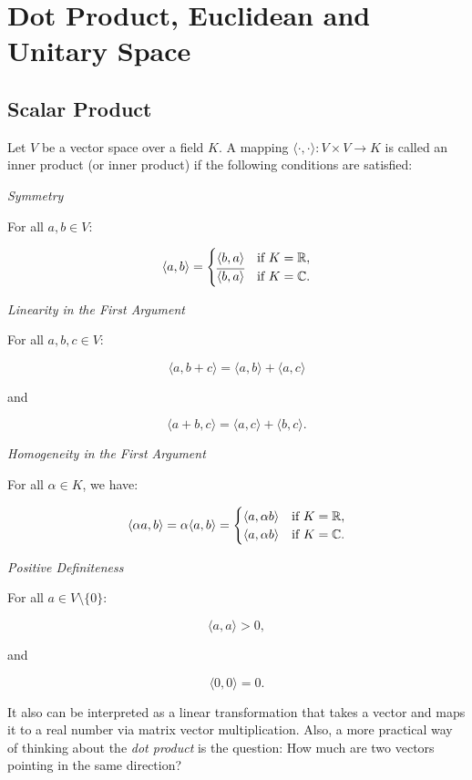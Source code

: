 \newpage
\section{Dot Product, Euclidean and Unitary Space}

\subsection{Scalar Product}

Let \(V\) be a vector space over a field \(K\). A mapping \(\langle \cdot, \cdot \rangle : V \times V 
\to K\) is called an inner product (or inner product) if the following conditions are satisfied:
\vspace{\baselineskip}

\emph{Symmetry}

For all \(a, b \in V\):

\[
    \langle a, b \rangle = 
    \begin{cases}
    \langle b, a \rangle & \text{if } K = \mathbb{R}, \\
    \overline{\langle b, a \rangle} & \text{if } K = \mathbb{C}.
    \end{cases}
\]

\emph{Linearity in the First Argument}

For all \(a, b, c \in V\):

\[
    \langle a, b + c \rangle = \langle a, b \rangle + \langle a, c \rangle
\]

and

\[
    \langle a + b, c \rangle = \langle a, c \rangle + \langle b, c \rangle.
\]

\emph{Homogeneity in the First Argument}

For all \(\alpha \in K\), we have:

\[
    \langle \alpha a, b \rangle = \alpha \langle a, b \rangle = 
    \begin{cases}
    \langle a, \alpha b \rangle & \text{if } K = \mathbb{R}, \\
    \langle a, \alpha b \rangle & \text{if } K = \mathbb{C}.
    \end{cases}
\]

\emph{Positive Definiteness}

For all \(a \in V \setminus \{0\}\):

\[
    \langle a, a \rangle > 0,
\]

and

\[
    \langle 0, 0 \rangle = 0.
\]

It also can be interpreted as a linear transformation that takes a vector and maps it to a real number
 via matrix vector multiplication. Also, a more practical way of thinking about the 
 \emph{dot product} is the question: How much are two vectors pointing in the same direction?

